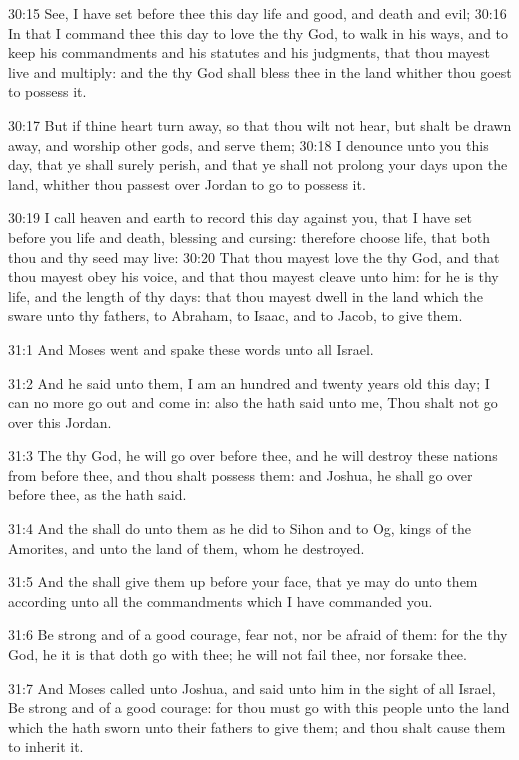 30:15 See, I have set before thee this day life and good, and death and evil; 30:16 In that I command thee this day to love the \LORD thy God, to walk in his ways, and to keep his commandments and his statutes and his judgments, that thou mayest live and multiply: and the \LORD thy God shall bless thee in the land whither thou goest to possess it.

30:17 But if thine heart turn away, so that thou wilt not hear, but shalt be drawn away, and worship other gods, and serve them; 30:18 I denounce unto you this day, that ye shall surely perish, and that ye shall not prolong your days upon the land, whither thou passest over Jordan to go to possess it.

30:19 I call heaven and earth to record this day against you, that I have set before you life and death, blessing and cursing: therefore choose life, that both thou and thy seed may live: 30:20 That thou mayest love the \LORD thy God, and that thou mayest obey his voice, and that thou mayest cleave unto him: for he is thy life, and the length of thy days: that thou mayest dwell in the land which the \LORD sware unto thy fathers, to Abraham, to Isaac, and to Jacob, to give them.

31:1 And Moses went and spake these words unto all Israel.

31:2 And he said unto them, I am an hundred and twenty years old this day; I can no more go out and come in: also the \LORD hath said unto me, Thou shalt not go over this Jordan.

31:3 The \LORD thy God, he will go over before thee, and he will destroy these nations from before thee, and thou shalt possess them: and Joshua, he shall go over before thee, as the \LORD hath said.

31:4 And the \LORD shall do unto them as he did to Sihon and to Og, kings of the Amorites, and unto the land of them, whom he destroyed.

31:5 And the \LORD shall give them up before your face, that ye may do unto them according unto all the commandments which I have commanded you.

31:6 Be strong and of a good courage, fear not, nor be afraid of them: for the \LORD thy God, he it is that doth go with thee; he will not fail thee, nor forsake thee.

31:7 And Moses called unto Joshua, and said unto him in the sight of all Israel, Be strong and of a good courage: for thou must go with this people unto the land which the \LORD hath sworn unto their fathers to give them; and thou shalt cause them to inherit it.

